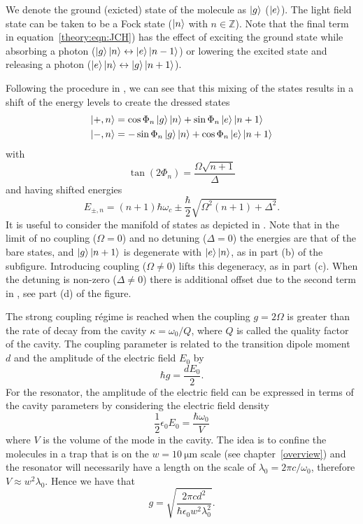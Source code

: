 We denote the ground (exicted) state of the molecule as $\ket{g}$ ($\ket{e}$).
The light field state can be taken to be a Fock state ($\ket{n}$ with $n \in
\mathbb{Z}$). Note that the final term in equation~\ref{theory:eqn:JCH}) has
the effect of exciting the ground state while absorbing a photon
($\ket{g}\ket{n} \leftrightarrow \ket{e}\ket{n-1}$) or lowering the excited state
and releasing a photon ($\ket{e}\ket{n} \leftrightarrow \ket{g}\ket{n+1}$).

Following the procedure in , we can see that this
mixing of the states results in a shift of the energy levels to create the
dressed states
%
\begin{align}
  \ket{+, n} &= \cos\Phi_n \ket{g}\ket{n} + \sin\Phi_n \ket{e}\ket{n+1} \\
  \ket{-, n} &= -\sin\Phi_n \ket{g}\ket{n} + \cos\Phi_n \ket{e}\ket{n+1}
\end{align}
%
with
%
\begin{equation}
  \tan(2\Phi_n) = \frac{\Omega\sqrt{n+1}}{\Delta}
\end{equation}
%
and having shifted energies
%
\begin{equation}
  E_{\pm, n} = (n+1)\hbar\omega_c \pm \frac{\hbar}{2}\sqrt{\Omega^2(n+1) +
  \Delta^2}.
  \label{theory:eqn:JCHenergies}
\end{equation}
%
It is useful to consider the manifold of states as depicted in
.  
Note that in the limit of no coupling
($\Omega = 0$) and no detuning ($\Delta = 0$) the energies are that of the bare
states, and $\ket{g}\ket{n+1}$ is degenerate with $\ket{e}\ket{n}$, as in part
(b) of the subfigure. Introducing coupling ($\Omega \neq 0$) lifts this
degeneracy, as in part (c). When the detuning is non-zero ($\Delta \neq 0$)
there is additional offset due to the second term in
, see part (d) of the figure.

The strong coupling r\'egime is reached when the coupling $g=2\Omega$ is
greater than the rate of decay from the cavity $\kappa = \omega_0 / Q$, where
$Q$ is called the quality factor of the cavity. The coupling parameter is
related to the transition dipole moment $d$ and the amplitude of the electric
field $E_0$ by
%
\begin{equation}
  \hbar g = \frac{d E_0}{2}.
\end{equation}
%
For the resonator, the amplitude of the electric field can be expressed in
terms of the cavity parameters by considering the electric field density
%
\begin{equation}
  \frac{1}{2} \epsilon_0 E_0 = \frac{\hbar \omega_0}{V}
\end{equation}
%
where $V$ is the volume of the mode in the cavity. The idea is to confine the
molecules in a trap that is on the $w=\SI{10}{\micro\meter}$ scale (see
chapter~\ref{overview}) and the resonator will necessarily have a length on the
scale of $\lambda_0 = 2\pi c / \omega_0$, therefore $V\approx w^2\lambda_0$.
Hence we have that
%
\begin{equation}
  g = \sqrt{\frac{2\pi c d^2}{\hbar \epsilon_0 w^2 \lambda_0^2}}.
\end{equation}

